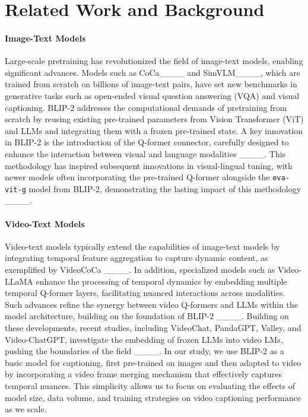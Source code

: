 \section{Related Work and Background}
\label{app:sec:related-work}
\paragraph{Image-Text Models}
Large-scale pretraining has revolutionized the field of image-text models, enabling significant advances. Models such as CoCa____ and SimVLM____, which are trained from scratch on billions of image-text pairs, have set new benchmarks in generative tasks such as open-ended visual question answering (VQA) and visual captioning. BLIP-2 addresses the computational demands of pretraining from scratch by reusing existing pre-trained parameters from Vision Transformer (ViT) and LLMs and integrating them with a frozen pre-trained state. A key innovation in BLIP-2 is the introduction of the Q-former connector, carefully designed to enhance the interaction between visual and language modalities ____. This methodology has inspired subsequent innovations in visual-lingual tuning, with newer models often incorporating the pre-trained Q-former alongside the \texttt{eva-vit-g} model from BLIP-2, demonstrating the lasting impact of this methodology ____.

\paragraph{Video-Text Models}
Video-text models typically extend the capabilities of image-text models by integrating temporal feature aggregation to capture dynamic content, as exemplified by VideoCoCa ____. In addition, specialized models such as Video-LLaMA enhance the processing of temporal dynamics by embedding multiple temporal Q-former layers, facilitating nuanced interactions across modalities. Such advances refine the synergy between video Q-formers and LLMs within the model architecture, building on the foundation of BLIP-2 ____. Building on these developments, recent studies, including VideoChat, PandaGPT, Valley, and Video-ChatGPT, investigate the embedding of frozen LLMs into video LMs, pushing the boundaries of the field ____. In our study, we use BLIP-2 as a basic model for captioning, first pre-trained on images and then adapted to video by incorporating a video frame merging mechanism that effectively captures temporal nuances. This simplicity allows us to focus on evaluating the effects of model size, data volume, and training strategies on video captioning performance as we scale. 

